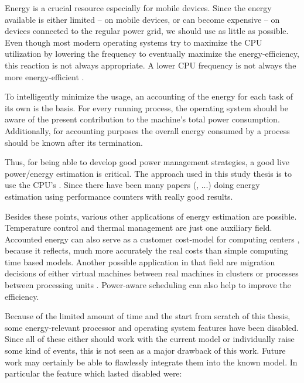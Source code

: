 
Energy is a crucial resource especially for mobile devices. Since the energy
available is either limited -- on mobile devices, or can become expensive -- on
devices connected to the regular power grid, we should use as little as
possible. Even though most modern operating systems try to maximize the CPU
utilization by lowering the frequency \cite{snowdon2010operating} to eventually
maximize the energy-efficiency, this reaction is not always appropriate. A lower
CPU frequency is not always the more energy-efficient
\cite{weissel2002process,snowdon2010operating}.

To intelligently minimize the usage, an accounting of the energy for each task
of its own is the basis. For every running process, the operating system should
be aware of the present contribution to the machine's total power consumption.
Additionally, for accounting purposes the overall energy consumed by a process
should be known after its termination.

Thus, for being able to develop good power management strategies, a good live
power/energy estimation is critical. The approach used in this study thesis is
to use the CPU's .  Since
\cite{bellosa2000benefits} there have been many papers
(\cite{Bertran2010,bertran2010decomposable,kellner03tempcontrol,isci2003runtime,
weissel2002process}, ...) doing energy estimation using performance counters
with really good results.

Besides these points, various other applications of energy estimation are
possible. Temperature control \cite{kellner03tempcontrol} and thermal management
\cite{merkel05tmsmpsys} are just one auxiliary field. Accounted energy can also
serve as a customer cost-model for computing centers \cite{Bertran2010}, because
it reflects, much more accurately the real costs than simple computing time
based models. Another possible application in that field are migration decisions
of either virtual machines between real machines in clusters or processes
between processing units \cite{merkel10rcscheduling}. Power-aware scheduling can
also help to improve the efficiency.


\label{sec:restrictions}

Because of the limited amount of time and the start from scratch of this thesis,
some energy-relevant processor and operating system features have been disabled.
Since all of these either should work with the current model or individually
raise some kind of events, this is not seen as a major drawback of this work.
Future work may certainly be able to flawlessly integrate them into the known
model. In particular the feature which lasted disabled were:

